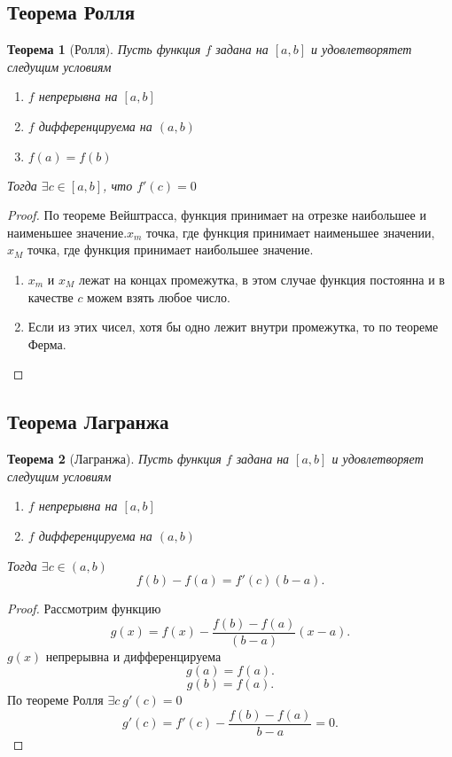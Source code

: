 \documentclass[a4paper]{scrartcl}
\newtheorem{theorem}{Теорема}
\begin{document}
\subsection{Теорема Ролля}
\begin{theorem}[Ролля]
    Пусть функция $f$ задана на  $[a,b]$ и удовлетворятет следущим условиям
     \begin{enumerate}
         \item $f$ непрерывна на  $[a,b]$
        \item  $f$ дифференцируема на  $(a,b)$ 
        \item $f(a) = f(b)$
    \end{enumerate}
    Тогда $\exists c \in [a,b]$, что $f'(c) = 0$
\end{theorem}
\begin{proof}
    По теореме Вейштрасса, функция принимает на отрезке наибольшее и наименьшее значение.$x_m$ точка, где функция принимает наименьшее значении,  $x_M$ точка, где функция принимает наибольшее значение.
    \begin{enumerate}
        \item $x_m$ и  $x_M$ лежат на концах промежутка, в этом случае функция постоянна и в качестве  $c$ можем взять любое число.
        \item Если из этих чисел, хотя бы одно лежит внутри промежутка, то по теореме Ферма.
    \end{enumerate}
\end{proof}
\subsection{Теорема Лагранжа}
\begin{theorem}[Лагранжа]
    Пусть функция $f$ задана на  $[a,b]$ и удовлетворяет следущим условиям
     \begin{enumerate}
         \item $f$ непрерывна на  $[a,b]$
        \item  $f$ дифференцируема на  $(a,b)$
    \end{enumerate}
    Тогда $\exists c \in (a,b)$
    \[
    f(b) - f(a) = f'(c)(b - a)
    .\] 
\end{theorem}
\begin{proof}
    Рассмотрим функцию
    \[
    g(x) = f(x) - \frac{f(b) - f(a)}{(b - a)}(x - a)
    .\] 
    $g(x)$ непрерывна и дифференцируема
    \[
    g(a)  = f(a)
    .\] 
    \[
    g(b) = f(a)
    .\] 
    По теореме Ролля $\exists c~  g'(c) = 0$
    \[
    g'(c) = f'(c) - \frac{f(b) - f(a)}{b - a} = 0
    .\] 
\end{proof}
\end{document}
